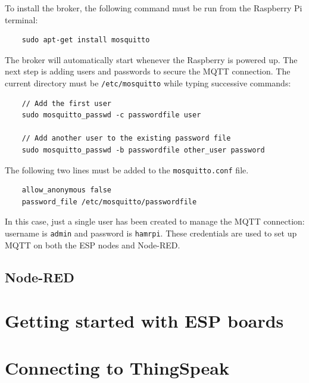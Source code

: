 To install the broker, the following command must be run from the Raspberry Pi terminal:

\begin{verbatim}
    sudo apt-get install mosquitto
\end{verbatim}

\noindent
The broker will automatically start whenever the Raspberry is powered up. The next step is adding users and passwords to secure the MQTT connection. The current directory must be \texttt{/etc/mosquitto} while typing successive commands:

\begin{verbatim}
    // Add the first user
    sudo mosquitto_passwd -c passwordfile user
    
    // Add another user to the existing password file
    sudo mosquitto_passwd -b passwordfile other_user password
\end{verbatim}

\noindent
The following two lines must be added to the \texttt{mosquitto.conf} file.

\begin{verbatim}
    allow_anonymous false
    password_file /etc/mosquitto/passwordfile
\end{verbatim}

\noindent
In this case, just a single user has been created to manage the MQTT connection: username is \texttt{admin} and password is \texttt{hamrpi}. These credentials are used to set up MQTT on both the ESP nodes and Node-RED.

\subsection{Node-RED}
\section{Getting started with ESP boards}
\section{Connecting to ThingSpeak}
